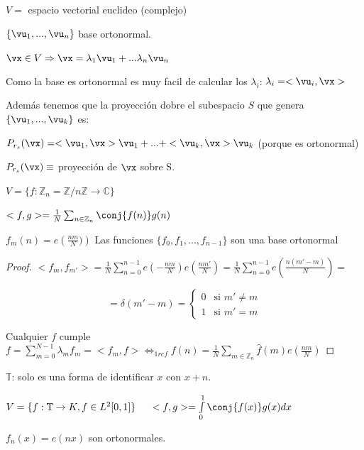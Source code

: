 $V =$ espacio vectorial euclideo (complejo)

$\{\vu_1, ..., \vu_n\}$ base ortonormal.

$\vx \in V \Rightarrow \vx = \lambda_1 \vu_1 + ... \lambda_n \vu_n$

Como la base es ortonormal es muy facil de calcular los $\lambda_i$: $\lambda_i = <\vu_i, \vx>$

Además tenemos que la proyección dobre el subespacio $S$ que genera $\{\vu_1,...,\vu_k\}$ es:

$ P_{r_s}(\vx) = <\vu_1, \vx>\vu_1 + ... + <\vu_k, \vx>\vu_k $ (porque es ortonormal)

$ P_{r_s}(\vx) \equiv $ proyección de $\vx$ sobre S.

$ V = \{f: \mathbb{Z}_n = \mathbb{Z}/n\mathbb{Z} \rightarrow \mathbb{C} \} $

$<f, g> = \frac{1}{N} \sum_{n \in \mathbb{Z}_n} \conj{f(n)} g(n)$


\begin{prop}
	$f_m(n) = e\left(\frac{nm}{N}) \right) $ Las funciones $\{ f_0, f_1, ..., f_{n-1}\}$ son una base ortonormal

\end{prop}

\begin{proof}

	$<f_m, f_{m'}> = \frac{1}{N} \sum^{n-1}_{n = 0} e \left(-\frac{nm}{N} \right) e \left(\frac{nm'}{N} \right) = \frac{1}{N} \sum^{n-1}_{n = 0} e \left( \frac{n (m' - m)}{N} \right) =$

	$$ = \delta (m' - m) = \begin{cases}
		0 & \mbox{si } m' \neq m \\
		1 & \mbox{si } m' = m
	\end{cases}
	$$

	Cualquier $f$ cumple $f = \sum^{N - 1}_{m = 0} \lambda_m f_m = <f_m, f> \Leftrightarrow_{1 ref} f(n) = \frac{1}{N} \sum_{m \in \mathbb{Z}_n} \hat{f}(m) e(\frac{nm}{N}) $

\end{proof}

\begin{prop}

	$\mathbb{T}$: solo es una forma de identificar $x$ con $x+n$.

	$V = \{ f: \mathbb{T} \rightarrow K, f \in L^2 [0,1]\} \;\;\;\;\; <f,g> = \int\limits^{1}_0 \conj{f(x)} g(x) dx $

	$f_n(x) = e(nx)$ son ortonormales.

\end{prop}

